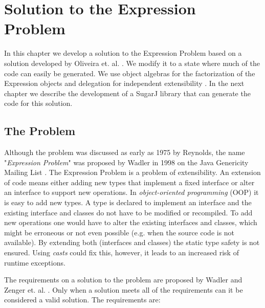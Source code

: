 \documentclass{report}
\begin{document}
\chapter{Solution to the Expression Problem}

In this chapter we develop a solution to the Expression Problem based on a solution developed by Oliveira et. al. \cite{Oliv-Extensibility-2012}. We modify it to a state where much of the code can easily be generated. We use object algebras for the factorization of the Expression objects and delegation for independent extensibility \cite{Tempero-Multiple-2000}. In the next chapter we describe the development of a SugarJ library that can generate the code for this solution.


\section{The Problem}
\label{theProblem}

Although the problem was discussed as early as 1975 by Reynolds, the name "\emph{Expression Problem}" was proposed by Wadler in 1998 on the Java Genericity Mailing List \cite{Reynolds-Abstraction-1975, Wadler-Expression-1998}. The Expression Problem is a problem of extensibility. An extension of code means either adding new types that implement a fixed interface or alter an interface to support new operations. In \emph{object-oriented programming} (OOP) it is easy to add new types. A type is declared to implement an interface and the existing interface and classes do not have to be modified or recompiled. To add new operations one would have to alter the existing interfaces and classes, which might be erroneous or not even possible (e.g. when the source code is not available). By extending both (interfaces and classes) the static type safety is not ensured. Using \emph{casts} could fix this, however, it leads to an increased risk of runtime exceptions.

The requirements on a solution to the problem are proposed by Wadler and Zenger et. al. \cite{Wadler-Expression-1998, Odersky-Expression-2005, Oliv-Extensibility-2012}. Only when a solution meets all of the requirements can it be considered a valid solution. The requirements are:
\end{document}
